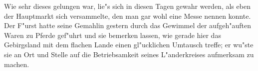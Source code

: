 \documentclass[color, ddc]{tudbook}
\begin{document}
    Wie sehr dieses gelungen war, lie"s sich in diesen Tagen gewahr werden, als eben
    der Hauptmarkt sich versammelte, den man gar wohl eine Messe nennen konnte. Der
    F"urst hatte seine Gemahlin gestern durch das Gewimmel der aufgeh"auften Waren zu
    Pferde gef"uhrt und sie bemerken lassen, wie gerade hier das Gebirgsland mit dem
    flachen Lande einen gl"ucklichen Umtausch treffe; er wu"ste sie an Ort und Stelle
    auf die Betriebsamkeit seines L"anderkreises aufmerksam zu machen.

\end{document}
